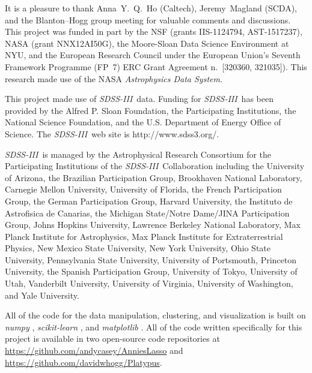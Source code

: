 \documentclass[12pt, letterpaper, preprint]{aastex}
\newcommand{\acronym}[1]{{\small{#1}}}
\newcommand{\project}[1]{\textsl{#1}}
\newcommand{\sdssiii}{\project{\acronym{SDSS-III}}}
\begin{document}
\acknowledgements
It is a pleasure to thank
  Anna~Y.~Q.~Ho (Caltech),
  Jeremy~Magland (\acronym{SCDA}), and
  the Blanton--Hogg group meeting
for valuable comments and discussions.
This project was funded in part by
  the \acronym{NSF} (grants \acronym{IIS-1124794}, \acronym{AST-1517237}),
  \acronym{NASA} (grant \acronym{NNX12AI50G}),
  the Moore-Sloan Data Science Environment at \acronym{NYU}, and
  the European Research Council under the
  European Union's Seventh Framework Programme (FP~7)
  \acronym{ERC} Grant Agreement n.~\acronym{[320360, 321035]}).
This research made use of the \acronym{NASA} \project{Astrophysics Data System}.

This project made use of \sdssiii\ data.
Funding for \sdssiii\ has been provided by the Alfred P. Sloan
Foundation, the Participating Institutions, the National Science
Foundation, and the \acronym{U.S.} Department of Energy Office of Science. The
\sdssiii\ web site is http://www.sdss3.org/.

\sdssiii\ is managed by the Astrophysical Research Consortium for the
Participating Institutions of the \sdssiii\ Collaboration including the
University of Arizona, the Brazilian Participation Group, Brookhaven
National Laboratory, Carnegie Mellon University, University of
Florida, the French Participation Group, the German Participation
Group, Harvard University, the Instituto de Astrofisica de Canarias,
the Michigan State/Notre Dame/\acronym{JINA} Participation Group, Johns Hopkins
University, Lawrence Berkeley National Laboratory, Max Planck
Institute for Astrophysics, Max Planck Institute for Extraterrestrial
Physics, New Mexico State University, New York University, Ohio State
University, Pennsylvania State University, University of Portsmouth,
Princeton University, the Spanish Participation Group, University of
Tokyo, University of Utah, Vanderbilt University, University of
Virginia, University of Washington, and Yale University.

All of the code for the data manipulation, clustering, and
visualization is built on \project{numpy} \citep{numpy},
\project{scikit-learn} \citep{sklearn}, and \project{matplotlib}
\citep{matplotlib}.
All of the code written specifically for this project is available in
two open-source code repositories at
\url{https://github.com/andycasey/AnniesLasso} and
\url{https://github.com/davidwhogg/Platypus}.
\end{document}
